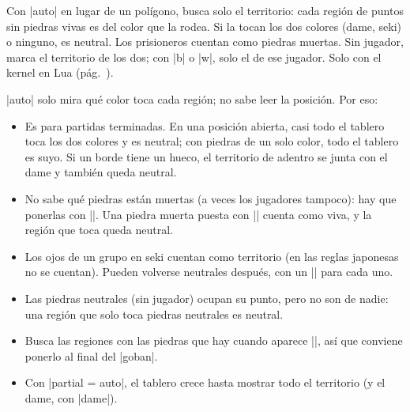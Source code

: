	\begin{command}{\territory{}}
		Con |auto| en lugar de un polígono, busca solo el territorio: cada región de puntos sin piedras vivas es del color que la rodea. Si la tocan los dos colores (dame, seki) o ninguno, es neutral. Los prisioneros cuentan como piedras muertas. Sin jugador, marca el territorio de los dos; con |b| o |w|, solo el de ese jugador. Solo con el kernel en Lua (pág.~\pageref{subsec:kernel}).

		\begin{codeexample}[width=4.75cm]
			\begin{goban}[label = {at = {above, left}}]

			\end{goban}
		\end{codeexample}

		|auto| solo mira qué color toca cada región; no sabe leer la posición. Por eso:
		\begin{itemize}
			\item Es para partidas terminadas. En una posición abierta, casi todo el tablero toca los dos colores y es neutral; con piedras de un solo color, todo el tablero es suyo. Si un borde tiene un hueco, el territorio de adentro se junta con el dame y también queda neutral.
			\item No sabe qué piedras están muertas (a veces los jugadores tampoco): hay que ponerlas con |\prisoners|. Una piedra muerta puesta con |\stones| cuenta como viva, y la región que toca queda neutral.
			\item Los ojos de un grupo en seki cuentan como territorio (en las reglas japonesas no se cuentan). Pueden volverse neutrales después, con un |\territory[n]| para cada uno.
			\item Las piedras neutrales (sin jugador) ocupan su punto, pero no son de nadie: una región que solo toca piedras neutrales es neutral.
			\item Busca las regiones con las piedras que hay cuando aparece |\territory|, así que conviene ponerlo al final del |goban|.
			\item Con |partial = auto|, el tablero crece hasta mostrar todo el territorio (y el dame, con |dame|).
		\end{itemize}
	\end{command}

